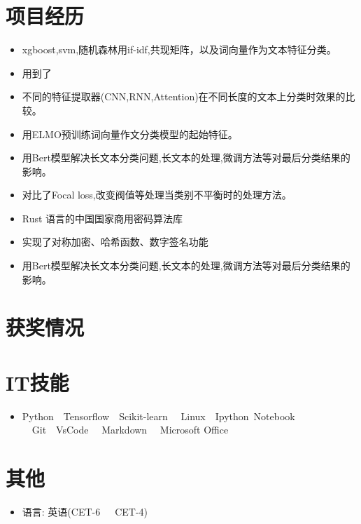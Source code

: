 \documentclass{resume}
\begin{document}
\section{项目经历}
\begin{itemize}
  \item xgboost,svm,随机森林用if-idf,共现矩阵，以及词向量作为文本特征分类。
  \item 用到了
  \item 不同的特征提取器(CNN,RNN,Attention)在不同长度的文本上分类时效果的比较。
  \item 用ELMO预训练词向量作文分类模型的起始特征。
  \item 用Bert模型解决长文本分类问题,长文本的处理,微调方法等对最后分类结果的影响。
  \item 对比了Focal loss,改变阀值等处理当类别不平衡时的处理方法。
\end{itemize}


\begin{itemize}
  \item Rust 语言的中国国家商用密码算法库
  \item 实现了对称加密、哈希函数、数字签名功能
  \item 用Bert模型解决长文本分类问题,长文本的处理,微调方法等对最后分类结果的影响。
\end{itemize}

\section{获奖情况}

\section{IT技能}
\begin{itemize}[parsep=0.5ex]
  \item Python\ \ Tensorflow\ \ Scikit-learn \ \ Linux\ \ Ipython\ Notebook \ \  Git\ \ VsCode \ \ Markdown \ \ Microsoft Office
\end{itemize}


\section{其他}
\begin{itemize}[parsep=0.5ex]
  \item 语言: 英语(CET-6\ \ \ CET-4)
\end{itemize}
\end{document}
